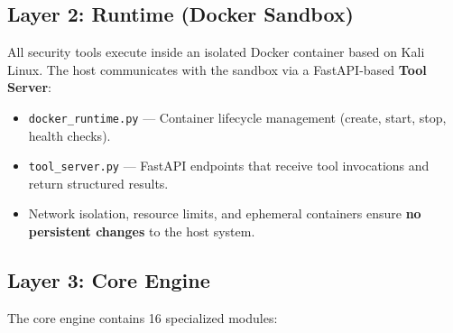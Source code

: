 \documentclass[12pt,a4paper]{article}
\begin{document}
\subsection{Layer 2: Runtime (Docker Sandbox)}

All security tools execute inside an isolated Docker container based on
Kali Linux. The host communicates with the sandbox via a FastAPI-based
\textbf{Tool Server}:

\begin{itemize}
    \item \texttt{docker\_runtime.py} — Container lifecycle management
          (create, start, stop, health checks).
    \item \texttt{tool\_server.py} — FastAPI endpoints that receive tool
          invocations and return structured results.
    \item Network isolation, resource limits, and ephemeral containers
          ensure \textbf{no persistent changes} to the host system.
\end{itemize}

\subsection{Layer 3: Core Engine}

The core engine contains 16 specialized modules:
\end{document}
